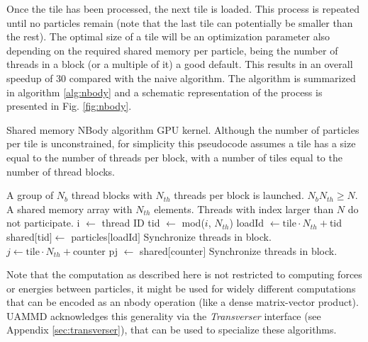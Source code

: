 \documentclass[twoside,openright,titlepage,numbers=noenddot,%
headinclude,footinclude,cleardoublepage=empty,abstract=on,
BCOR=5mm,fontsize=11pt, dvipsnames, paper=b5
]{scrreprt}
\newcommand{\uammd}{\gls{UAMMD}\xspace}
\begin{document}
Once the tile has been processed, the next tile is loaded. This process is repeated until no particles remain (note that the last tile can potentially be smaller than the rest).
The optimal size of a tile will be an optimization parameter also depending on the required shared memory per particle, being the number of threads in a block (or a multiple of it) a good default.
This results in an overall speedup of 30 compared with the naive algorithm.
The algorithm is summarized in algorithm \ref{alg:nbody} and a schematic representation of the process is presented in Fig. \ref{fig:nbody}.
\begin{algorithm}[H]
  \caption[ ]{Shared memory NBody algorithm GPU kernel. Although the number of particles per tile is unconstrained, for simplicity this pseudocode assumes a tile has a size equal to the number of threads per block, with a number of tiles equal to the number of thread blocks.} \label{alg:nbody}
  \begin{algorithmic}[1]
    \Require
    \Statex A group of $N_b$ thread blocks with $N_{th}$ threads per block is launched.
    \Statex $N_bN_{th}\ge N$.
    \Statex A shared memory array with $N_{th}$ elements.
    \Ensure
    \Statex Threads with index larger than $N$ do not participate.
    \State i $\gets$ thread ID 
    \State tid $\gets$ mod($i$, $N_{th}$) 
    \State loadId $\gets \text{tile}\cdot N_{th}+$tid
    \State shared$[$tid$]\gets$ particles$[$loadId$]$
    \State Synchronize threads in block. 
    \State $j \gets \text{tile}\cdot N_{th} + \text{counter}$
    \State pj $\gets$ shared$[$counter$]$
    \EndFor
    \State Synchronize threads in block. 
    \EndFor
  \end{algorithmic}
\end{algorithm}

Note that the computation as described here is not restricted to computing forces or energies between particles, it might be used for widely different computations that can be encoded as an nbody operation (like a dense matrix-vector product).
\uammd acknowledges this generality via the \emph{Transverser} interface (see Appendix \ref{sec:transverser}), that can be used to specialize these algorithms.
\end{document}
